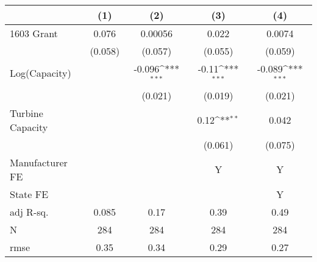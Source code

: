 {
\def\sym#1{\ifmmode^{#1}\else\(^{#1}\)\fi}
\begin{tabular}{l*{4}{c}}
\toprule
                &\multicolumn{1}{c}{(1)}         &\multicolumn{1}{c}{(2)}         &\multicolumn{1}{c}{(3)}         &\multicolumn{1}{c}{(4)}         \\
\midrule
1603 Grant      &    0.076         &  0.00056         &    0.022         &   0.0074         \\
                &  (0.058)         &  (0.057)         &  (0.055)         &  (0.059)         \\
\addlinespace
Log(Capacity)   &                  &   -0.096\sym{***}&    -0.11\sym{***}&   -0.089\sym{***}\\
                &                  &  (0.021)         &  (0.019)         &  (0.021)         \\
\addlinespace
Turbine Capacity&                  &                  &     0.12\sym{**} &    0.042         \\
                &                  &                  &  (0.061)         &  (0.075)         \\
\midrule
Manufacturer FE &                  &                  &        Y         &        Y         \\
State FE        &                  &                  &                  &        Y         \\
adj R-sq.       &    0.085         &     0.17         &     0.39         &     0.49         \\
N               &      284         &      284         &      284         &      284         \\
rmse            &     0.35         &     0.34         &     0.29         &     0.27         \\
\bottomrule
\end{tabular}
}
